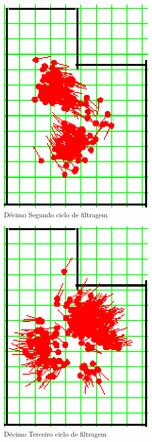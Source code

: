 \begin{figure}[H]
  \centering
  \includegraphics[scale=0.6]{figuras/cen1_ex3/13.eps}
  \caption[Décimo Segundo Ciclo de Filtragem]{Décimo Segundo ciclo de filtragem}
  \label{img:cen1_ex3_13}
\end{figure}

\begin{figure}[H]
  \centering
  \includegraphics[scale=0.6]{figuras/cen1_ex3/14.eps}
  \caption[Décimo Terceiro Ciclo de Filtragem]{Décimo Terceiro ciclo de filtragem}
  \label{img:cen1_ex3_14}
\end{figure}

